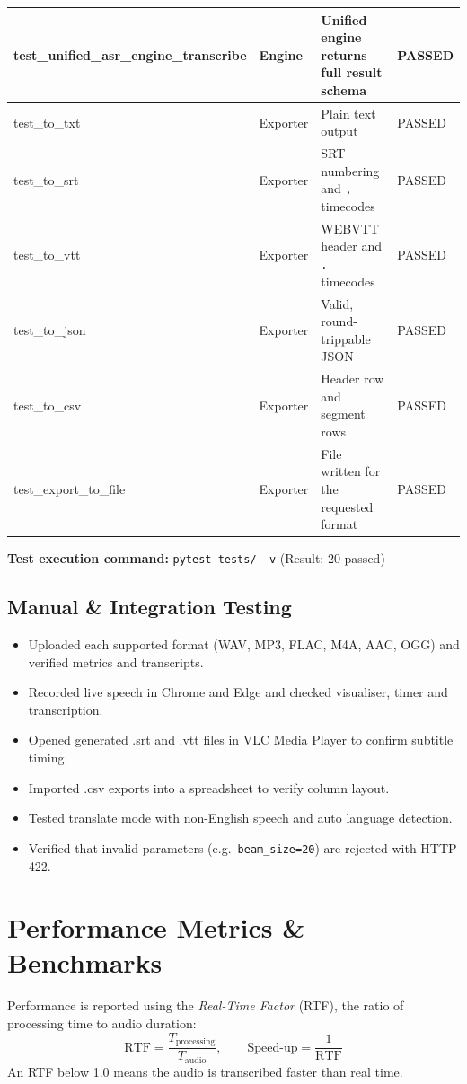\documentclass[11pt,a4paper]{article}
\begin{document}
\begin{longtable}{|L{4.6cm}|L{3.0cm}|p{6.2cm}|L{1.4cm}|}
test\_unified\_asr\_engine\_transcribe & Engine & Unified engine returns full result schema & PASSED \\ \hline
test\_to\_txt & Exporter & Plain text output & PASSED \\ \hline
test\_to\_srt & Exporter & SRT numbering and \texttt{,} timecodes & PASSED \\ \hline
test\_to\_vtt & Exporter & WEBVTT header and \texttt{.} timecodes & PASSED \\ \hline
test\_to\_json & Exporter & Valid, round-trippable JSON & PASSED \\ \hline
test\_to\_csv & Exporter & Header row and segment rows & PASSED \\ \hline
test\_export\_to\_file & Exporter & File written for the requested format & PASSED \\ \hline
\end{longtable}

\textbf{Test execution command:} \texttt{pytest tests/ -v} \quad (Result: 20 passed)

\subsection{Manual \& Integration Testing}
\begin{itemize}[leftmargin=1.2em,itemsep=1pt]
  \item Uploaded each supported format (WAV, MP3, FLAC, M4A, AAC, OGG) and verified metrics and transcripts.
  \item Recorded live speech in Chrome and Edge and checked visualiser, timer and transcription.
  \item Opened generated .srt and .vtt files in VLC Media Player to confirm subtitle timing.
  \item Imported .csv exports into a spreadsheet to verify column layout.
  \item Tested translate mode with non-English speech and auto language detection.
  \item Verified that invalid parameters (e.g.\ \texttt{beam\_size=20}) are rejected with HTTP 422.
\end{itemize}

\section{Performance Metrics \& Benchmarks}
Performance is reported using the \emph{Real-Time Factor} (RTF), the ratio of processing time to audio duration:
\[
\text{RTF} = \frac{T_{\text{processing}}}{T_{\text{audio}}}, \qquad \text{Speed-up} = \frac{1}{\text{RTF}}
\]
An RTF below 1.0 means the audio is transcribed faster than real time.
\end{document}
